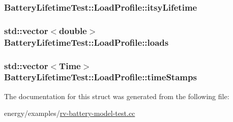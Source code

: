 \subsubsection[{\texorpdfstring{itsy\+Lifetime}{itsyLifetime}}]{ Battery\+Lifetime\+Test\+::\+Load\+Profile\+::itsy\+Lifetime}\hypertarget{structBatteryLifetimeTest_1_1LoadProfile_aa863b81b31dc904d436e483a84eeeb5e}{}\label{structBatteryLifetimeTest_1_1LoadProfile_aa863b81b31dc904d436e483a84eeeb5e}
\subsubsection[{\texorpdfstring{loads}{loads}}]{\setlength{\rightskip}{0pt plus 5cm}std\+::vector$<$double$>$ Battery\+Lifetime\+Test\+::\+Load\+Profile\+::loads}\hypertarget{structBatteryLifetimeTest_1_1LoadProfile_a2e05ba4feddee725b7282b2d9e5291fc}{}\label{structBatteryLifetimeTest_1_1LoadProfile_a2e05ba4feddee725b7282b2d9e5291fc}
\subsubsection[{\texorpdfstring{time\+Stamps}{timeStamps}}]{\setlength{\rightskip}{0pt plus 5cm}std\+::vector$<${\bf Time}$>$ Battery\+Lifetime\+Test\+::\+Load\+Profile\+::time\+Stamps}\hypertarget{structBatteryLifetimeTest_1_1LoadProfile_a292317a5a2b3c5c450347f3c8ab72378}{}\label{structBatteryLifetimeTest_1_1LoadProfile_a292317a5a2b3c5c450347f3c8ab72378}


The documentation for this struct was generated from the following file\+:\begin{DoxyCompactItemize}
\item 
energy/examples/\hyperlink{rv-battery-model-test_8cc}{rv-\/battery-\/model-\/test.\+cc}\end{DoxyCompactItemize}
